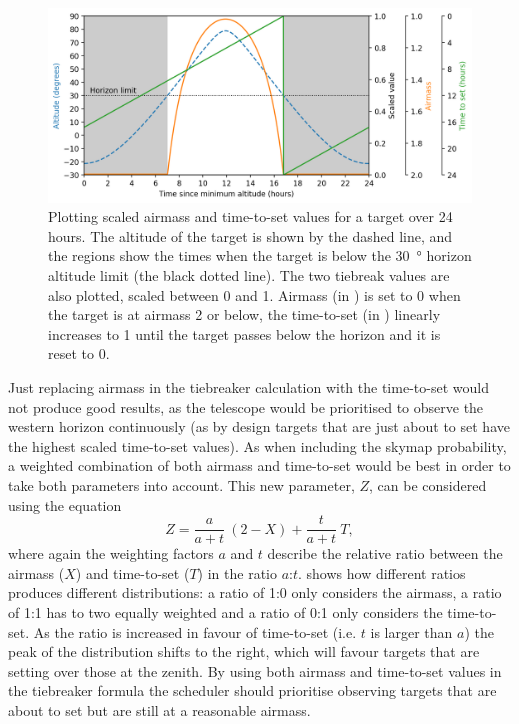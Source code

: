 \begin{colsection}
\begin{figure}[t]
    \begin{center}
        \includegraphics[width=\linewidth]{images/airmass-tts.png}
    \end{center}
    \caption[Plotting scaled airmass and time-to-set values for a target]{
        Plotting scaled airmass and time-to-set values for a target over 24 hours.
        The altitude of the target is shown by the  dashed line, and the  regions show the times when the target is below the \SI{30}{\degree} horizon altitude limit (the black dotted line).
        The two tiebreak values are also plotted, scaled between 0 and 1. Airmass (in ) is set to 0 when the target is at airmass 2 or below, the time-to-set (in ) linearly increases to 1 until the target passes below the horizon and it is reset to 0.
    }\label{fig:airmass_tts}
\end{figure}

Just replacing airmass in the tiebreaker calculation with the time-to-set would not produce good results, as the telescope would be prioritised to observe the western horizon continuously (as by design targets that are just about to set have the highest scaled time-to-set values). As when including the skymap probability, a weighted combination of both airmass and time-to-set would be best in order to take both parameters into account. This new parameter, $Z$, can be considered using the equation
%
\begin{equation}
    Z = \frac{a}{a+t}~(2-X) + \frac{t}{a+t}~T,
    \label{eq:at_ratio}
\end{equation}
%
where again the weighting factors $a$ and $t$ describe the relative ratio between the airmass ($X$) and time-to-set ($T$) in the ratio $a$:$t$.  shows how different ratios produces different distributions: a ratio of 1:0 only considers the airmass, a ratio of 1:1 has to two equally weighted and a ratio of 0:1 only considers the time-to-set. As the ratio is increased in favour of time-to-set (i.e. $t$ is larger than $a$) the peak of the distribution shifts to the right, which will favour targets that are setting over those at the zenith. By using both airmass and time-to-set values in the tiebreaker formula the scheduler should prioritise observing targets that are about to set but are still at a reasonable airmass.


\end{colsection}
